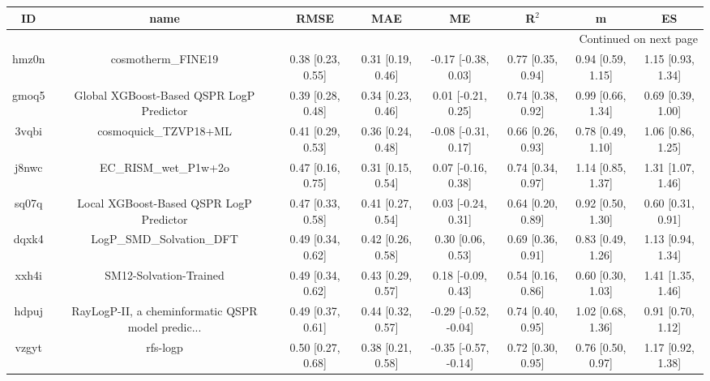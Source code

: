 \documentclass{article}
\begin{document}
\begin{center}
\begin{longtable}{|cccccccc|}
\toprule
    ID &                                               name &               RMSE &                MAE &                    ME &              R$^2$ &                    m &                    ES \\
\midrule
\endhead
\midrule
\multicolumn{8}{r}{{Continued on next page}} \\
\midrule
\endfoot

\bottomrule
\endlastfoot
 hmz0n &                                 cosmotherm\_FINE19 &  0.38 [0.23, 0.55] &  0.31 [0.19, 0.46] &   -0.17 [-0.38, 0.03] &  0.77 [0.35, 0.94] &    0.94 [0.59, 1.15] &     1.15 [0.93, 1.34] \\
 gmoq5 &           Global XGBoost-Based QSPR LogP Predictor &  0.39 [0.28, 0.48] &  0.34 [0.23, 0.46] &    0.01 [-0.21, 0.25] &  0.74 [0.38, 0.92] &    0.99 [0.66, 1.34] &     0.69 [0.39, 1.00] \\
 3vqbi &                              cosmoquick\_TZVP18+ML &  0.41 [0.29, 0.53] &  0.36 [0.24, 0.48] &   -0.08 [-0.31, 0.17] &  0.66 [0.26, 0.93] &    0.78 [0.49, 1.10] &     1.06 [0.86, 1.25] \\
 j8nwc &                              EC\_RISM\_wet\_P1w+2o &  0.47 [0.16, 0.75] &  0.31 [0.15, 0.54] &    0.07 [-0.16, 0.38] &  0.74 [0.34, 0.97] &    1.14 [0.85, 1.37] &     1.31 [1.07, 1.46] \\
 sq07q &            Local XGBoost-Based QSPR LogP Predictor &  0.47 [0.33, 0.58] &  0.41 [0.27, 0.54] &    0.03 [-0.24, 0.31] &  0.64 [0.20, 0.89] &    0.92 [0.50, 1.30] &     0.60 [0.31, 0.91] \\
 dqxk4 &                          LogP\_SMD\_Solvation\_DFT &  0.49 [0.34, 0.62] &  0.42 [0.26, 0.58] &     0.30 [0.06, 0.53] &  0.69 [0.36, 0.91] &    0.83 [0.49, 1.26] &     1.13 [0.94, 1.34] \\
 xxh4i &                             SM12-Solvation-Trained &  0.49 [0.34, 0.62] &  0.43 [0.29, 0.57] &    0.18 [-0.09, 0.43] &  0.54 [0.16, 0.86] &    0.60 [0.30, 1.03] &     1.41 [1.35, 1.46] \\
 hdpuj &  RayLogP-II, a cheminformatic QSPR model predic... &  0.49 [0.37, 0.61] &  0.44 [0.32, 0.57] &  -0.29 [-0.52, -0.04] &  0.74 [0.40, 0.95] &    1.02 [0.68, 1.36] &     0.91 [0.70, 1.12] \\
 vzgyt &                                           rfs-logp &  0.50 [0.27, 0.68] &  0.38 [0.21, 0.58] &  -0.35 [-0.57, -0.14] &  0.72 [0.30, 0.95] &    0.76 [0.50, 0.97] &     1.17 [0.92, 1.38] \\

\end{longtable}
\end{center}
\end{document}
